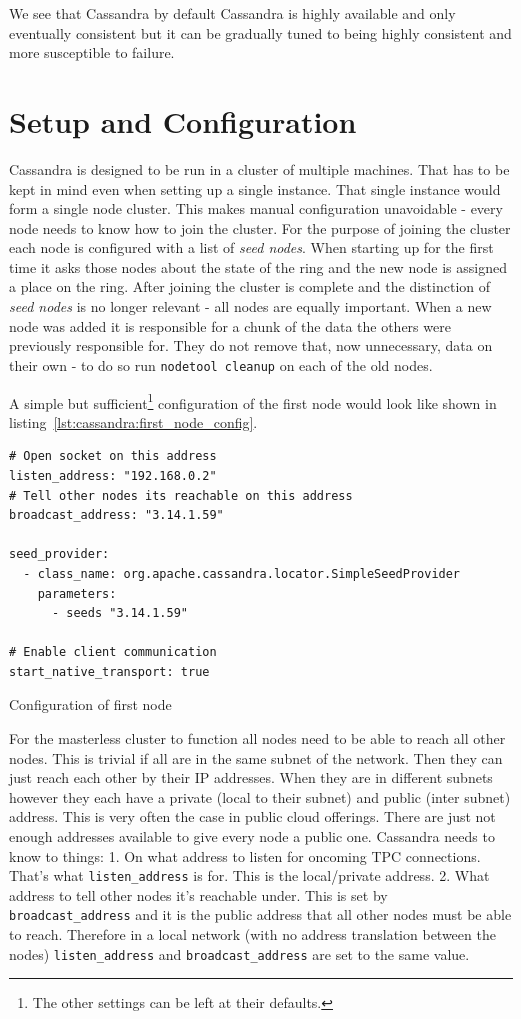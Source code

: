 We see that Cassandra by default Cassandra is highly available and only eventually consistent but it can be gradually tuned to being highly consistent and more susceptible to failure.

\section{Setup and Configuration}  %
Cassandra is designed to be run in a cluster of multiple machines. That has to be kept in mind even when setting up a single instance. That single instance would form a single node cluster. This makes manual configuration unavoidable - every node needs to know how to join the cluster.
For the purpose of joining the cluster each node is configured with a list of \textit{seed nodes}. When starting up for the first time it asks those nodes about the state of the ring and the new node is assigned a place on the ring. After joining the cluster is complete and the distinction of \textit{seed nodes} is no longer relevant - all nodes are equally important.
When a new node was added it is responsible for a chunk of the data the others were previously responsible for. They do not remove that, now unnecessary, data on their own - to do so run \texttt{nodetool cleanup} on each of the old nodes.

A simple but sufficient\footnote{The other settings can be left at their defaults.} configuration of the first node would look like shown in listing~\ref{lst:cassandra:first_node_config}.

\begin{listing}[ht]
  \begin{verbatim}
# Open socket on this address
listen_address: "192.168.0.2"
# Tell other nodes its reachable on this address
broadcast_address: "3.14.1.59"

seed_provider:
  - class_name: org.apache.cassandra.locator.SimpleSeedProvider
    parameters:
      - seeds "3.14.1.59"

# Enable client communication
start_native_transport: true
  \end{verbatim}
  \caption{Configuration of first node}
  \label{lst:cassandra:first_node_config}
\end{listing}

For the masterless cluster to function all nodes need to be able to reach all other nodes. This is trivial if all are in the same subnet of the network. Then they can just reach each other by their IP addresses.
When they are in different subnets however they each have a private (local to their subnet) and public (inter subnet) address. This is very often the case in public cloud offerings. There are just not enough addresses available to give every node a public one.
Cassandra needs to know to things:
1. On what address to listen for oncoming TPC connections. That's what \texttt{listen\_address} is for. This is the local/private address.
2. What address to tell other nodes it's reachable under. This is set by \texttt{broadcast\_address} and it is the public address that all other nodes must be able to reach.
Therefore in a local network (with no address translation between the nodes) \texttt{listen\_address} and \texttt{broadcast\_address} are set to the same value.

